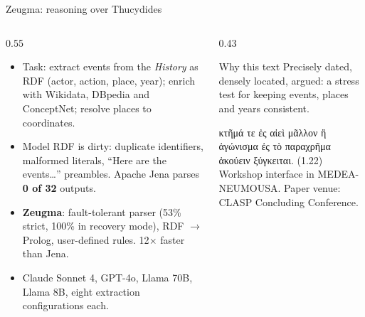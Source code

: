 \documentclass[aspectratio=169, 10pt]{beamer}
\newcommand{\key}[1]{\textcolor{aegean}{\textbf{#1}}}
\newcommand{\hl}[1]{\textcolor{terracotta}{\textbf{#1}}}
\begin{document}
\begin{frame}{Zeugma: reasoning over Thucydides}
  \begin{columns}[T]
    \begin{column}{0.55\textwidth}
      \begin{itemize}
        \item Task: extract events from the \emph{History} as RDF (actor, action, place, year); enrich with Wikidata, DBpedia and ConceptNet; resolve places to coordinates.
        \item Model RDF is dirty: duplicate identifiers, malformed literals, ``Here are the events\ldots'' preambles. Apache Jena parses \hl{0 of 32} outputs.
        \item \key{Zeugma}: fault-tolerant parser (53\% strict, 100\% in recovery mode), RDF $\rightarrow$ Prolog, user-defined rules. 12$\times$ faster than Jena.
        \item Claude Sonnet 4, GPT-4o, Llama 70B, Llama 8B, eight extraction configurations each.
      \end{itemize}
    \end{column}
    \begin{column}{0.43\textwidth}
      \begin{block}{Why this text}
        Precisely dated, densely located, argued: a stress test for keeping events, places and years consistent.
      \end{block}
      {\porson\small κτῆμά τε ἐς αἰεὶ μᾶλλον ἢ ἀγώνισμα ἐς τὸ παραχρῆμα ἀκούειν ξύγκειται.} {\scriptsize (1.22)}\\[4pt]
      \footnotesize Workshop interface in MEDEA-NEUMOUSA. Paper venue: CLASP Concluding Conference.
    \end{column}
  \end{columns}
\end{frame}
\end{document}
